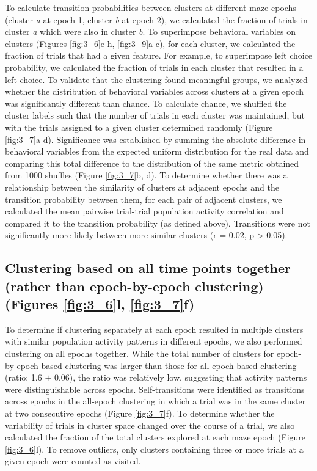To calculate transition probabilities between clusters at different maze epochs (cluster \textit{a} at epoch 1, cluster \textit{b} at epoch 2), we calculated the fraction of trials in cluster \textit{a} which were also in cluster \textit{b}. To superimpose behavioral variables on clusters (Figures \ref{fig:3_6}e-h, \ref{fig:3_9}a-c), for each cluster, we calculated the fraction of trials that had a given feature. For example, to superimpose left choice probability, we calculated the fraction of trials in each cluster that resulted in a left choice. To validate that the clustering found meaningful groups, we analyzed whether the distribution of behavioral variables across clusters at a given epoch was significantly different than chance. To calculate chance, we shuffled the cluster labels such that the number of trials in each cluster was maintained, but with the trials assigned to a given cluster determined randomly (Figure \ref{fig:3_7}a-d). Significance was established by summing the absolute difference in behavioral variables from the expected uniform distribution for the real data and comparing this total difference to the distribution of the same metric obtained from 1000 shuffles (Figure \ref{fig:3_7}b, d). To determine whether there was a relationship between the similarity of clusters at adjacent epochs and the transition probability between them, for each pair of adjacent clusters, we calculated the mean pairwise trial-trial population activity correlation and compared it to the transition probability (as defined above). Transitions were not significantly more likely between more similar clusters (r = 0.02, p > 0.05).

\subsection[Clustering based on all time points together (rather than epoch-by-epoch clustering)]{Clustering based on all time points together (rather than epoch-by-epoch clustering) (Figures \ref{fig:3_6}l, \ref{fig:3_7}f)} \label{methods:clustering_together}

To determine if clustering separately at each epoch resulted in multiple clusters with similar population activity patterns in different epochs, we also performed clustering on all epochs together. While the total number of clusters for epoch-by-epoch-based clustering was larger than those for all-epoch-based clustering (ratio: 1.6  $\pm$ 0.06), the ratio was relatively low, suggesting that activity patterns were distinguishable across epochs. Self-transitions were identified as transitions across epochs in the all-epoch clustering in which a trial was in the same cluster at two consecutive epochs (Figure \ref{fig:3_7}f). To determine whether the variability of trials in cluster space changed over the course of a trial, we also calculated the fraction of the total clusters explored at each maze epoch (Figure \ref{fig:3_6}l). To remove outliers, only clusters containing three or more trials at a given epoch were counted as visited.

